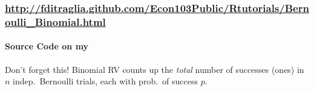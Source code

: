 \documentclass[handout]{beamer}
\begin{document}
\begin{frame}
	\frametitle{\href{http://fditraglia.github.com/Econ103Public/Rtutorials/Bernoulli_Binomial.html}{\small http://fditraglia.github.com/Econ103Public/Rtutorials/Bernoulli\_Binomial.html}}

\framesubtitle{Source Code on my \href{https://github.com/fditraglia/Econ103Public/blob/master/Rtutorials/Bernoulli_Binomial.R}{}}



\begin{figure}
\end{figure}

\begin{alertblock}{Don't forget this!}
 Binomial RV counts up the \emph{total} number of successes (ones) in $n$ indep.\ Bernoulli trials, each with prob.\ of success $p$.
\end{alertblock}

\end{frame}

\end{document}
